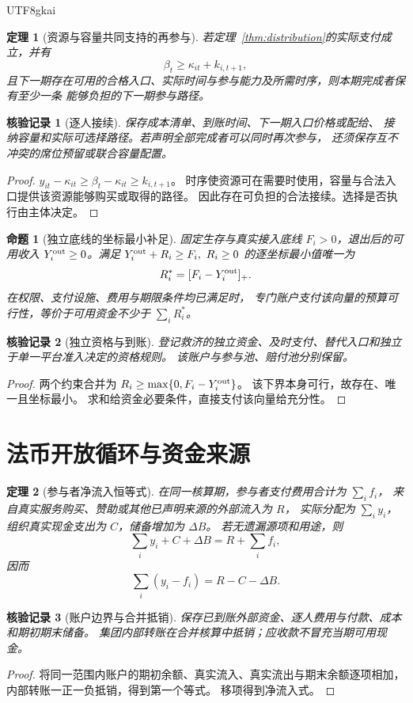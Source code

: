\documentclass[12pt,a4paper,openany]{report}
\newtheorem{theorem}{定理}[chapter]
\newtheorem{proposition}{命题}[chapter]
\newtheorem{Certificate}{核验记录}[chapter]
\begin{document}
\begin{CJK*}{UTF8}{gkai}
\begin{theorem}[资源与容量共同支持的再参与]
\label{thm:reentry}
若定理~\ref{thm:distribution}的实际支付成立，并有
\[
\beta_t\ge\kappa_{it}+k_{i,t+1},
\]
且下一期存在可用的合格入口、实际时间与参与能力及所需时序，则本期完成者保有至少一条
能够负担的下一期参与路径。
\end{theorem}
\begin{Certificate}[逐人接续]
保存成本清单、到账时间、下一期入口价格或配给、
接纳容量和实际可选择路径。若声明全部完成者可以同时再次参与，
还须保存互不冲突的席位预留或联合容量配置。
\end{Certificate}
\begin{proof}
\(y_{it}-\kappa_{it}\ge\beta_t-\kappa_{it}\ge k_{i,t+1}\)。
时序使资源可在需要时使用，容量与合法入口提供该资源能够购买或取得的路径。
因此存在可负担的合法接续。选择是否执行由主体决定。
\end{proof}

\begin{proposition}[独立底线的坐标最小补足]
\label{prop:floor}
固定生存与真实接入底线 \(F_i>0\)，退出后的可用收入
\(Y_i^{\rm out}\ge0\)。满足
\(Y_i^{\rm out}+R_i\ge F_i,\ R_i\ge0\)
的逐坐标最小值唯一为
\[
R_i^*=[F_i-Y_i^{\rm out}]_+.
\]
在权限、支付设施、费用与期限条件均已满足时，
专门账户支付该向量的预算可行性，等价于可用资金不少于 \(\sum_iR_i^*\)。
\end{proposition}
\begin{Certificate}[独立资格与到账]
登记救济的独立资金、及时支付、替代入口和独立于单一平台准入决定的资格规则。
该账户与参与池、赔付池分别保留。
\end{Certificate}
\begin{proof}
两个约束合并为 \(R_i\ge\max\{0,F_i-Y_i^{\rm out}\}\)。
该下界本身可行，故存在、唯一且坐标最小。
求和给资金必要条件，直接支付该向量给充分性。
\end{proof}

\section{法币开放循环与资金来源}
\begin{theorem}[参与者净流入恒等式]
\label{thm:net-inflow}
在同一核算期，参与者支付费用合计为 \(\sum_if_i\)，
来自真实服务购买、赞助或其他已声明来源的外部流入为 \(R\)，
实际分配为 \(\sum_iy_i\)，组织真实现金支出为 \(C\)，储备增加为 \(\Delta B\)。
若无遗漏源项和用途，则
\[
\sum_i y_i+C+\Delta B=R+\sum_i f_i,
\]
因而
\[
\boxed{\sum_i(y_i-f_i)=R-C-\Delta B.}
\]
\end{theorem}
\begin{Certificate}[账户边界与合并抵销]
保存已到账外部资金、逐人费用与付款、成本和期初期末储备。
集团内部转账在合并核算中抵销；应收款不冒充当期可用现金。
\end{Certificate}
\begin{proof}
将同一范围内账户的期初余额、真实流入、真实流出与期末余额逐项相加，
内部转账一正一负抵销，得到第一个等式。
移项得到净流入式。
\end{proof}


\end{CJK*}
\end{document}
